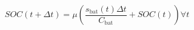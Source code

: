 \begin{equation}
	SOC(t+\Delta t) = \mu\left(\frac{s_\text{bat}(t)\Delta t}{C_\text{bat}} + SOC(t)\right) \forall t
	\label{ch1:equ:next-state-of-charge}
\end{equation}